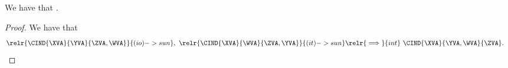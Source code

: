 \begin{proposition}
  We have that \inddecomprevdef.%
\end{proposition}

\begin{proof}
  We have that 
  \begin{align*}
    \relr {\CIND{\XVA}{\YVA}{\ZVA, \WVA}} {(io)->sun} ,\ 
    \relr {\CIND{\XVA}{\WVA}{\ZVA, \YVA}} {(it)->sun}
    \relr {\implies} {int} &\ 
    \CIND{\XVA}{\YVA,\WVA}{\ZVA}.
  \end{align*}
\end{proof}
